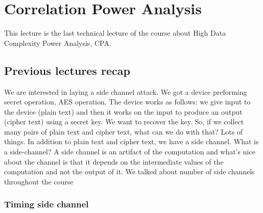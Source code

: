 \chapter{Correlation Power Analysis} \label{c8_fifthcapter}

This lecture is the last technical lecture of the course about High Data Complexity Power Analysis, CPA.

\section{Previous lectures recap}\label{c8_prev_lectures_recap:sec}

We are interested in laying a side channel attack. We got a device preforming secret operation, AES operation. The device works as follows: we give input to the device (plain text) and then it works on the input to produce an output (cipher text) using a secret key. We want to recover the key. So, if we collect many pairs of plain text and cipher text, what can we do with that? Lots of things. In addition to plain text and cipher text, we have a side channel. What is a side-channel? A side channel is an artifact of the computation and what's nice about the channel is that it depends on the intermediate values of the computation and not the output of it. We talked about number of side channels throughout the course

\subsection{Timing side channel}\label{c8_prev_lectures_recap_timing_sc:subsec}

